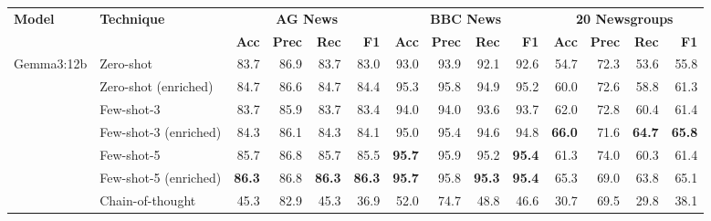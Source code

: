 \documentclass[sigconf,nonacm]{acmart}
\begin{document}
\begin{table}[t]
\centering
\small
\begin{adjustbox}{width=\textwidth}
\begin{tabular}{@{}llrrrrrrrrrrrr@{}}
\toprule
\textbf{Model} & \textbf{Technique} & \multicolumn{4}{c}{\textbf{AG News}} & \multicolumn{4}{c}{\textbf{BBC News}} & \multicolumn{4}{c}{\textbf{20 Newsgroups}} \\
\cmidrule(lr){3-6} \cmidrule(lr){7-10} \cmidrule(lr){11-14}
& & \textbf{Acc} & \textbf{Prec} & \textbf{Rec} & \textbf{F1} & \textbf{Acc} & \textbf{Prec} & \textbf{Rec} & \textbf{F1} & \textbf{Acc} & \textbf{Prec} & \textbf{Rec} & \textbf{F1} \\
\midrule
\multirow{8}{*}{Gemma3:12b} 
& Zero-shot & 83.7 & 86.9 & 83.7 & 83.0 & 93.0 & 93.9 & 92.1 & 92.6 & 54.7 & 72.3 & 53.6 & 55.8 \\
& \cellcolor{gray!10}Zero-shot (enriched) & \cellcolor{gray!10}84.7 & \cellcolor{gray!10}86.6 & \cellcolor{gray!10}84.7 & \cellcolor{gray!10}84.4 & \cellcolor{gray!10}95.3 & \cellcolor{gray!10}95.8 & \cellcolor{gray!10}94.9 & \cellcolor{gray!10}95.2 & \cellcolor{gray!10}60.0 & \cellcolor{gray!10}72.6 & \cellcolor{gray!10}58.8 & \cellcolor{gray!10}61.3 \\
& Few-shot-3 & 83.7 & 85.9 & 83.7 & 83.4 & 94.0 & 94.0 & 93.6 & 93.7 & 62.0 & 72.8 & 60.4 & 61.4 \\
& \cellcolor{gray!10}Few-shot-3 (enriched) & \cellcolor{gray!10}84.3 & \cellcolor{gray!10}86.1 & \cellcolor{gray!10}84.3 & \cellcolor{gray!10}84.1 & \cellcolor{gray!10}95.0 & \cellcolor{gray!10}95.4 & \cellcolor{gray!10}94.6 & \cellcolor{gray!10}94.8 & \cellcolor{gray!10}\textbf{66.0} & \cellcolor{gray!10}71.6 & \cellcolor{gray!10}\textbf{64.7} & \cellcolor{gray!10}\textbf{65.8} \\
& Few-shot-5 & 85.7 & 86.8 & 85.7 & 85.5 & \textbf{95.7} & 95.9 & 95.2 & \textbf{95.4} & 61.3 & 74.0 & 60.3 & 61.4 \\
& \cellcolor{gray!10}Few-shot-5 (enriched) & \cellcolor{gray!10}\textbf{86.3} & \cellcolor{gray!10}86.8 & \cellcolor{gray!10}\textbf{86.3} & \cellcolor{gray!10}\textbf{86.3} & \cellcolor{gray!10}\textbf{95.7} & \cellcolor{gray!10}95.8 & \cellcolor{gray!10}\textbf{95.3} & \cellcolor{gray!10}\textbf{95.4} & \cellcolor{gray!10}65.3 & \cellcolor{gray!10}69.0 & \cellcolor{gray!10}63.8 & \cellcolor{gray!10}65.1 \\
& Chain-of-thought & 45.3 & 82.9 & 45.3 & 36.9 & 52.0 & 74.7 & 48.8 & 46.6 & 30.7 & 69.5 & 29.8 & 38.1 \\

\end{tabular}
\end{adjustbox}
\end{table}
\end{document}
